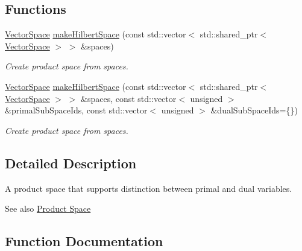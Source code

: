 \subsection*{Functions}
\begin{DoxyCompactItemize}
\item 
\hyperlink{classSpacy_1_1VectorSpace}{Vector\+Space} \hyperlink{group__ProductSpaceGroup_gad4b421dd4563c7d575550ab4d5d3ff0d_gad4b421dd4563c7d575550ab4d5d3ff0d}{make\+Hilbert\+Space} (const std\+::vector$<$ std\+::shared\+\_\+ptr$<$ \hyperlink{classSpacy_1_1VectorSpace}{Vector\+Space} $>$ $>$ \&spaces)
\begin{DoxyCompactList}\small\item\em Create product space from spaces. \end{DoxyCompactList}\item 
\hyperlink{classSpacy_1_1VectorSpace}{Vector\+Space} \hyperlink{group__ProductSpaceGroup_ga24762c7baa8ea3a76af7c984874f7e37_ga24762c7baa8ea3a76af7c984874f7e37}{make\+Hilbert\+Space} (const std\+::vector$<$ std\+::shared\+\_\+ptr$<$ \hyperlink{classSpacy_1_1VectorSpace}{Vector\+Space} $>$ $>$ \&spaces, const std\+::vector$<$ unsigned $>$ \&primal\+Sub\+Space\+Ids, const std\+::vector$<$ unsigned $>$ \&dual\+Sub\+Space\+Ids=\{\})
\begin{DoxyCompactList}\small\item\em Create product space from spaces. \end{DoxyCompactList}\end{DoxyCompactItemize}


\subsection{Detailed Description}
A product space that supports distinction between primal and dual variables. 

\begin{DoxySeeAlso}{See also}
\hyperlink{group__ProductSpaceGroup}{Product Space} 
\end{DoxySeeAlso}


\subsection{Function Documentation}
\hypertarget{group__ProductSpaceGroup_gad4b421dd4563c7d575550ab4d5d3ff0d_gad4b421dd4563c7d575550ab4d5d3ff0d}{}
